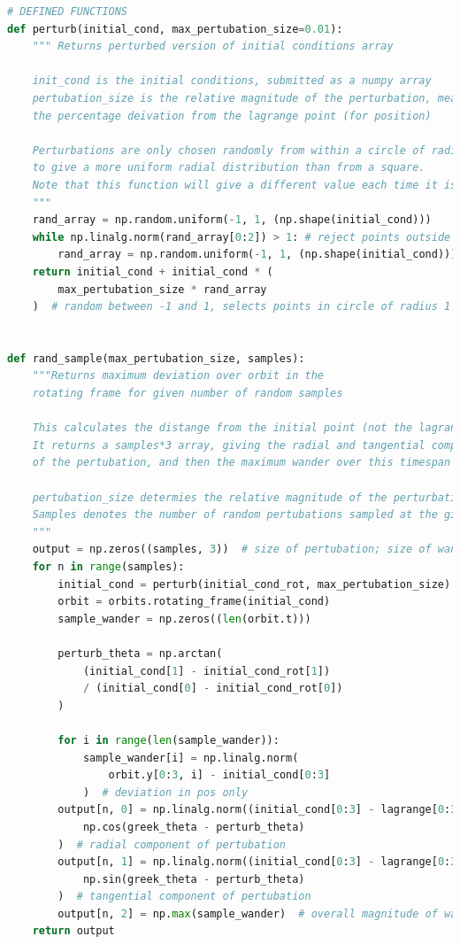 \documentclass[11pt, a4paper,twocolumn]{article} %
\begin{document}
\begin{appendices}
\begin{lstlisting}[language=Python]
# DEFINED FUNCTIONS
def perturb(initial_cond, max_pertubation_size=0.01):
	""" Returns perturbed version of initial conditions array
	
	init_cond is the initial conditions, submitted as a numpy array
	pertubation_size is the relative magnitude of the perturbation, measured as 
	the percentage deivation from the lagrange point (for position)
	
	Perturbations are only chosen randomly from within a circle of radius one, 
	to give a more uniform radial distribution than from a square.
	Note that this function will give a different value each time it is run
	"""
	rand_array = np.random.uniform(-1, 1, (np.shape(initial_cond)))
	while np.linalg.norm(rand_array[0:2]) > 1: # reject points outside circle
		rand_array = np.random.uniform(-1, 1, (np.shape(initial_cond)))
	return initial_cond + initial_cond * (
		max_pertubation_size * rand_array	
	)  # random between -1 and 1, selects points in circle of radius 1


def rand_sample(max_pertubation_size, samples):
	"""Returns maximum deviation over orbit in the 
	rotating frame for given number of random samples
	
	This calculates the distange from the initial point (not the lagrange point)
	It returns a samples*3 array, giving the radial and tangential components
	of the pertubation, and then the maximum wander over this timespan
	
	pertubation_size determies the relative magnitude of the perturbation
	Samples denotes the number of random pertubations sampled at the given size
	"""
	output = np.zeros((samples, 3))  # size of pertubation; size of wander
	for n in range(samples):
		initial_cond = perturb(initial_cond_rot, max_pertubation_size)
		orbit = orbits.rotating_frame(initial_cond)
		sample_wander = np.zeros((len(orbit.t)))
		
		perturb_theta = np.arctan(
			(initial_cond[1] - initial_cond_rot[1])
			/ (initial_cond[0] - initial_cond_rot[0])
		)
		
		for i in range(len(sample_wander)):
			sample_wander[i] = np.linalg.norm(
				orbit.y[0:3, i] - initial_cond[0:3]
			)  # deviation in pos only
		output[n, 0] = np.linalg.norm((initial_cond[0:3] - lagrange[0:3])) * np.abs(
			np.cos(greek_theta - perturb_theta)
		)  # radial component of pertubation
		output[n, 1] = np.linalg.norm((initial_cond[0:3] - lagrange[0:3])) * np.abs(
			np.sin(greek_theta - perturb_theta)
		)  # tangential component of pertubation
		output[n, 2] = np.max(sample_wander)  # overall magnitude of wander
	return output



\end{lstlisting}
\end{appendices}
\end{document}
